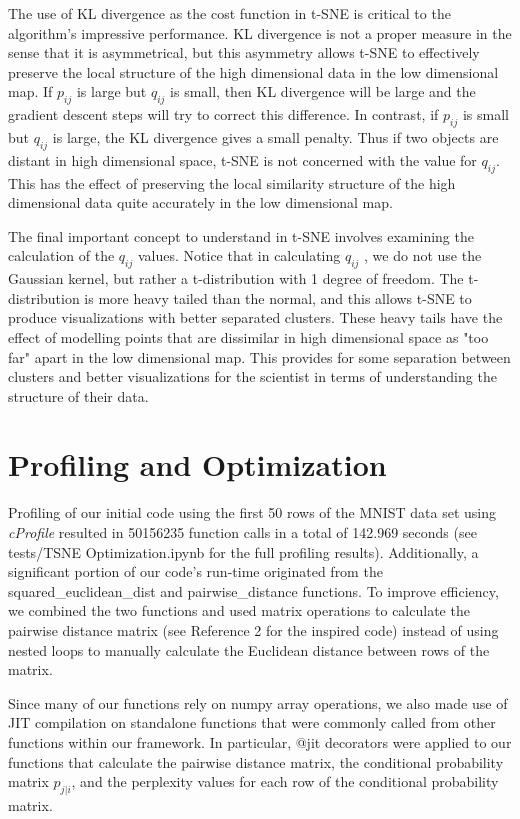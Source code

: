 \documentclass{article}
\begin{document}
The use of KL divergence as the cost function in t-SNE is critical to the algorithm's impressive performance. KL divergence is not a proper measure in the sense that it is asymmetrical, but this asymmetry allows t-SNE to effectively preserve the local structure of the high dimensional data in the low dimensional map. If $p_{ij}$ is large but $q_{ij}$ is small, then KL divergence will be large and the gradient descent steps will try to correct this difference. In contrast, if $p_{ij}$ is small but $q_{ij}$ is large, the KL divergence gives a small penalty. Thus if two objects are distant in high dimensional space, t-SNE is not concerned with the value for $q_{ij}$. This has the effect of preserving the local similarity structure of the high dimensional data quite accurately in the low dimensional map.

The final important concept to understand in t-SNE involves examining the calculation of the $q_{ij}$ values. Notice that in calculating $q_{ij}$ , we do not use the Gaussian kernel, but rather a t-distribution with 1 degree of freedom. The t-distribution is more heavy tailed than the normal, and this allows t-SNE to produce visualizations with better separated clusters. These heavy tails have the effect of modelling points that are dissimilar in high dimensional space as "too far" apart in the low dimensional map. This provides for some separation between clusters and better visualizations for the scientist in terms of understanding the structure of their data.

\section*{Profiling and Optimization}

Profiling of our initial code using the first 50 rows of the MNIST data set using \textit{cProfile} resulted in 50156235 function calls in a total of 142.969 seconds (see tests/TSNE Optimization.ipynb for the full profiling results). Additionally, a significant portion of our code's run-time originated from the squared\_euclidean\_dist and pairwise\_distance functions. To improve efficiency, we combined the two functions and used matrix operations to calculate the pairwise distance matrix (see Reference 2 for the inspired code) instead of using nested loops to manually calculate the Euclidean distance between rows of the matrix.

Since many of our functions rely on numpy array operations, we also made use of JIT compilation on standalone functions that were commonly called from other functions within our framework. In particular, @jit decorators were applied to our functions that calculate the pairwise distance matrix, the conditional probability matrix $p_{j|i}$, and the perplexity values for each row of the conditional probability matrix.
\end{document}
